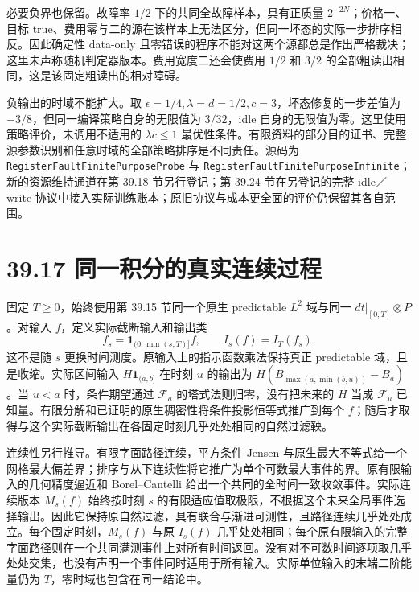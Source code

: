 \documentclass[
  11pt,
  oneside]{book}
\begin{document}
必要负界也保留。故障率 \(1/2\) 下的共同全故障样本，具有正质量 \(2^{-2N}\)；价格一、目标 true、费用零与二的源在该样本上无法区分，但同一坏态的实际一步排序相反。因此确定性 data-only 且零错误的程序不能对这两个源都总是作出严格裁决；这里未声称随机判定器版本。费用宽度二还会使费用 \(1/2\) 和 \(3/2\) 的全部粗读出相同，这是该固定粗读出的相对障碍。

负输出的时域不能扩大。取 \(\epsilon=1/4,\lambda=d=1/2,c=3\)，坏态修复的一步差值为 \(-3/8\)，但同一编译策略自身的无限值为 \(3/32\)，idle 自身的无限值为零。这里使用策略评价，未调用不适用的 \(\lambda c\le1\) 最优性条件。有限资料的部分目的证书、完整源参数识别和任意时域的全部策略排序是不同责任。源码为 \nolinkurl{RegisterFaultFinitePurposeProbe} 与 \nolinkurl{RegisterFaultFinitePurposeInfinite}；新的资源维持通道在第 39.18 节另行登记；第 39.24 节在另登记的完整 idle／write 协议中接入实际训练账本；原旧协议与成本更全面的评价仍保留其各自范围。

\section{39.17 同一积分的真实连续过程}\label{ux540cux4e00ux79efux5206ux7684ux771fux5b9eux8fdeux7eedux8fc7ux7a0b}

固定 \(T\ge0\)，始终使用第 39.15 节同一个原生 predictable \(L^2\) 域与同一 \(dt|_{[0,T]}\otimes P\)。对输入 \(f\)，定义实际截断输入和输出类 \[f_s=\mathbf1_{(0,\min(s,T)]}f,\qquad I_s(f)=I_T(f_s).\] 这不是随 \(s\) 更换时间测度。原输入上的指示函数乘法保持真正 predictable 域，且是收缩。实际区间输入 \(H\mathbf1_{(a,b]}\) 在时刻 \(u\) 的输出为 \(H(B_{\max(a,\min(b,u))}-B_a)\)。当 \(u<a\) 时，条件期望通过 \(\mathcal F_a\) 的塔式法则归零，没有把未来的 \(H\) 当成 \(\mathcal F_u\) 已知量。有限分解和已证明的原生稠密性将条件投影恒等式推广到每个 \(f\)；随后才取得与这个实际截断输出在各固定时刻几乎处处相同的自然过滤鞅。

连续性另行推导。有限字面路径连续，平方条件 Jensen 与原生最大不等式给一个网格最大偏差界；排序与从下连续性将它推广为单个可数最大事件的界。原有限输入的几何精度逼近和 Borel--Cantelli 给出一个共同的全时间一致收敛事件。实际连续版本 \(M_s(f)\) 始终按时刻 \(s\) 的有限适应值取极限，不根据这个未来全局事件选择输出。因此它保持原自然过滤，具有联合与渐进可测性，且路径连续几乎处处成立。每个固定时刻，\(M_s(f)\) 与原 \(I_s(f)\) 几乎处处相同；每个原有限输入的完整字面路径则在一个共同满测事件上对所有时间返回。没有对不可数时间逐项取几乎处处交集，也没有声明一个事件同时适用于所有输入。实际单位输入的末端二阶能量仍为 \(T\)，零时域也包含在同一结论中。
\end{document}
